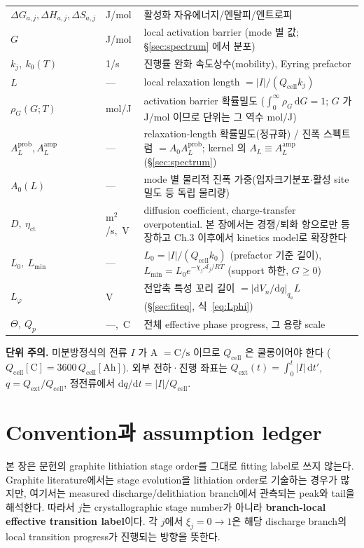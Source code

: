 \documentclass[11pt,a4paper]{article}
\newcommand{\dd}{\mathrm{d}}
\newcommand{\cell}{\mathrm{cell}}
\newcommand{\ext}{\mathrm{ext}}
\begin{document}
\begin{longtable}{p{} p{} p{}}
$\Delta G_{a,j},\Delta H_{a,j},\Delta S_{a,j}$ & J/mol & 활성화 자유에너지/엔탈피/엔트로피 \\
$G$ & J/mol & local activation barrier (mode 별 값; \S\ref{sec:spectrum} 에서 분포) \\
$k_j,\ k_0(T)$ & 1/s & 진행률 완화 속도상수(mobility), Eyring prefactor \\
$L$ & --- & local relaxation length $=|I|/(Q_\cell k_j)$ \\
$\rho_G(G;T)$ & mol/J & activation barrier 확률밀도 ($\int_0^\infty\rho_G\,\dd G=1$; $G$ 가 J/mol 이므로 단위는 그 역수 mol/J) \\
$A_L^{\mathrm{prob}},A_L^{\mathrm{amp}}$ & --- & relaxation-length 확률밀도(정규화) / 진폭 스펙트럼 $=A_0 A_L^{\mathrm{prob}}$; kernel 의 $A_L\equiv A_L^{\mathrm{amp}}$ (\S\ref{sec:spectrum}) \\
$A_0(L)$ & --- & mode 별 물리적 진폭 가중(입자크기분포$\cdot$활성 site 밀도 등 독립 물리량) \\
$D,\ \eta_{\mathrm{ct}}$ & m$^2$/s,\ V & diffusion coefficient, charge-transfer overpotential. 본 장에서는 경쟁/퇴화 항으로만 등장하고 Ch.3 이후에서 kinetics model로 확장한다 \\
$L_0,\ L_{\min}$ & --- & $L_0=|I|/(Q_\cell k_0)$ (prefactor 기준 길이), $L_{\min}=L_0 e^{-\chi_j\mathcal A_j/RT}$ (support 하한, $G\!\ge\!0$) \\
$L_\varphi$ & V & 전압축 특성 꼬리 길이 $=|\dd V_n/\dd q|_{q_a}L$ (\S\ref{sec:fiteq}, 식~\eqref{eq:Lphi}) \\
$\Theta,\ Q_p$ & ---,\ C & 전체 effective phase progress, 그 용량 scale \\
\bottomrule
\end{longtable}
\textbf{단위 주의.} 미분방정식의 전류 $I$ 가 A $=\mathrm{C/s}$ 이므로 $Q_\cell$ 은 쿨롱이어야 한다
($Q_\cell[\mathrm C]=3600\,Q_\cell[\mathrm{Ah}]$). 외부 전하·진행 좌표는 $Q_\ext(t)=\int_0^t|I|\,\dd t'$,
$q=Q_\ext/Q_\cell$, 정전류에서 $\dd q/\dd t=|I|/Q_\cell$.

\section{Convention과 assumption ledger}\label{sec:convention}
본 장은 문헌의 graphite lithiation stage order를 그대로 fitting label로 쓰지 않는다. Graphite literature에서는
stage evolution을 lithiation order로 기술하는 경우가 많지만, 여기서는 measured discharge/delithiation branch에서 관측되는
peak와 tail을 해석한다. 따라서 $j$는 crystallographic stage number가 아니라 \textbf{branch-local effective transition label}이다.
각 $j$에서 $\xi_j=0\to1$은 해당 discharge branch의 local transition progress가 진행되는 방향을 뜻한다.
\end{document}
